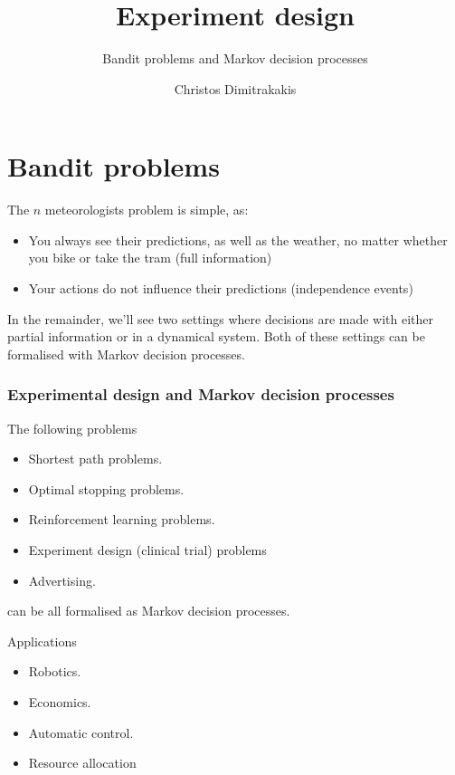 \documentclass[9pt]{beamer}
\title{Experiment design}
\subtitle{Bandit problems and Markov decision processes}
\author{Christos Dimitrakakis}
\institute{UiO}
\begin{document}
\begin{frame}
  \titlepage
\end{frame}

\begin{frame}
  \tableofcontents
\end{frame}


\section{Bandit problems}
\label{sec:exp-design-bandit}

\begin{frame}

  The $n$ meteorologists problem is simple, as:

  \begin{itemize}
  \item You always see their predictions, as well as the weather, no matter whether you bike or take the tram (full information)
  \item Your actions do not influence their predictions (independence events)
  \end{itemize}
  
  In the remainder, we'll see two settings where decisions are made with either \alert{partial information} or in a \alert{dynamical system}. Both of these settings can be formalised with Markov decision processes.

\end{frame}



{
  \begin{frame}\frametitle{Experimental design and Markov decision processes}
    The following problems
    \begin{itemize}
    \item Shortest path problems.
    \item Optimal stopping problems.
    \item Reinforcement learning problems.
    \item Experiment design (clinical trial) problems
    \item Advertising. 
    \end{itemize}
    can be all formalised as \alert{Markov decision processes}.

    \begin{block}{Applications}
      \begin{itemize}
      \item Robotics.
      \item Economics.
      \item Automatic control.
      \item Resource allocation
      \end{itemize}
    \end{block}
  \end{frame}
}
\end{document}
